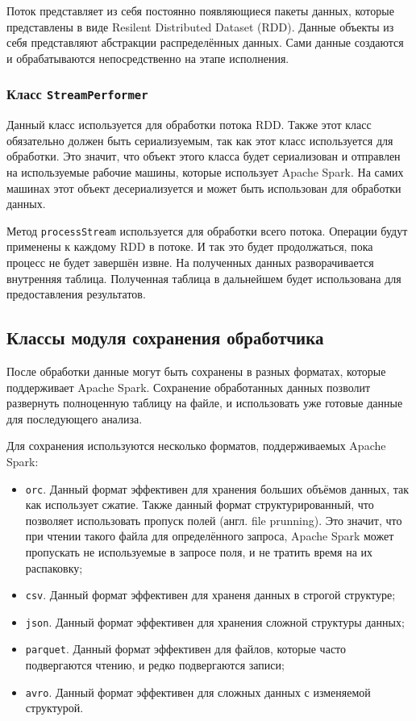 Поток представляет из себя постоянно появляющиеся пакеты данных, которые представлены в виде Resilent Distributed Dataset (RDD).
Данные объекты из себя представляют абстракции распределённых данных.
Сами данные создаются и обрабатываются непосредственно на этапе исполнения.

\subsubsection{Класс \texttt{StreamPerformer}}
Данный класс используется для обработки потока RDD.
Также этот класс обязательно должен быть сериализуемым, так как этот класс используется для обработки.
Это значит, что объект этого класса будет сериализован и отправлен на используемые рабочие машины, которые использует Apache Spark.
На самих машинах этот объект десериализуется и может быть использован для обработки данных.

Метод \texttt{processStream} используется для обработки всего потока.
Операции будут применены к каждому RDD в потоке.
И так это будет продолжаться, пока процесс не будет завершён извне.
На полученных данных разворачивается внутренняя таблица.
Полученная таблица в дальнейшем будет использована для предоставления результатов.



\subsection{Классы модуля сохранения обработчика}
После обработки данные могут быть сохранены в разных форматах, которые поддерживает Apache Spark.
Сохранение обработанных данных позволит развернуть полноценную таблицу на файле, и использовать уже готовые данные для последующего анализа.

Для сохранения используются несколько форматов, поддерживаемых Apache Spark:
\begin{itemize}
    \item \texttt{orc}. Данный формат эффективен для хранения больших объёмов данных, так как использует сжатие. Также данный формат структурированный, что позволяет использовать пропуск полей (англ. file prunning). Это значит, что при чтении такого файла для определённого запроса, Apache Spark может пропускать не используемые в запросе поля, и не тратить время на их распаковку;
    \item \texttt{csv}. Данный формат эффективен для храненя данных в строгой структуре;
    \item \texttt{json}. Данный формат эффективен для хранения сложной структуры данных;
    \item \texttt{parquet}. Данный формат эффективен для файлов, которые часто подвергаются чтению, и редко подвергаются записи;
    \item \texttt{avro}. Данный формат эффективен для сложных данных с изменяемой структурой.
\end{itemize}


